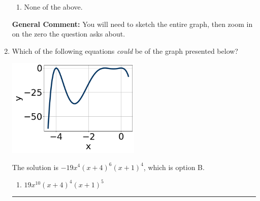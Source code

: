 \documentclass{extbook}[14pt]
\newcommand{\litem}[1]{\item #1

\rule{\textwidth}{0.4pt}}
\begin{document}
\begin{enumerate}
{\begin{enumerate}[label=\Alph*.]
\item None of the above.\end{enumerate}
\textbf{General Comment:} You will need to sketch the entire graph, then zoom in on the zero the question asks about.
}
\litem{
Which of the following equations \textit{could} be of the graph presented below?

\begin{center}
    \includegraphics[width=0.5\textwidth]{../Figures/polyGraphToFunctionC.png}
\end{center}



The solution is \( -19x^{4} (x + 4)^{6} (x + 1)^{4} \), which is option B.\begin{enumerate}[label=\Alph*.]
\item \( 19x^{10} (x + 4)^{4} (x + 1)^{5} \)


\end{enumerate}}
\end{enumerate}
\end{document}

